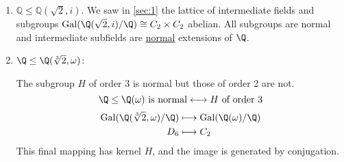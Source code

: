 \documentclass{article}
\DeclareMathOperator{\Gal}{Gal}
\begin{document}
\begin{eg} \leavevmode
    \begin{enumerate}[label=(\roman*)]
        \item $\mathbb{Q} \leq \mathbb{Q}(\sqrt{2}, i)$. We saw in \cref{sec:1} the lattice of intermediate fields and subgroups $\Gal(\Q(\sqrt{2}, i)/\Q) \cong C_2 \times C_2$ abelian.
            All subgroups are normal and intermediate subfields are \hyperlink{def:normal}{normal} extensions of $\Q$.
        \item $\Q \leq \Q(\sqrt[3]{2}, \omega)$:
            \begin{center}
            \end{center}
            The subgroup $H$ of order 3 is normal but those of order 2 are not.
            \begin{equation*}
                \Q \leq \Q(\omega) \text{ is normal} \longleftrightarrow H \text{ of order } 3
            \end{equation*}
            \begin{align*}
                \Gal(\Q(\sqrt[3]{2}, \omega)/\Q) &\longmapsto \Gal(\Q(\omega)/\Q) \\
                D_6 &\longmapsto C_2
            \end{align*}
            This final mapping has kernel $H$, and the image is generated by conjugation.
    \end{enumerate}
\end{eg}
\end{document}
